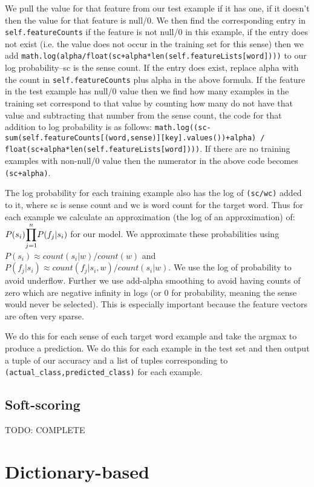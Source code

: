 \documentclass{article}
\begin{document}
We pull the value for that feature from our test example if it has one, if it doesn't then the value for that feature is null/0. We then find the corresponding entry in \texttt{self.featureCounts} if the feature is not null/0 in this example, if the entry does not exist (i.e. the value does not occur in the training set for this sense) then we add \texttt{math.log(alpha/float(sc+alpha*len(self.featureLists[word])))} to our log probability--sc is the sense count. If the entry does exist, replace alpha with the count in \texttt{self.featureCounts} plus alpha in the above formula. If the feature in the test example has null/0 value then we find how many examples in the training set correspond to that value by counting how many do not have that value and subtracting that number from the sense count, the code for that addition to log probability is as follows: \texttt{math.log((sc-sum(self.featureCounts[(word,sense)][key].values())+alpha) / float(sc+alpha*len(self.featureLists[word])))}. If there are no training examples with non-null/0 value then the numerator in the above code becomes \texttt{(sc+alpha)}.

The log probability for each training example also has the log of \texttt{(sc/wc)} added to it, where sc is sense count and wc is word count for the target word. Thus for each example we calculate an approximation (the log of an approximation) of: $P(s_i)\mathlarger{\prod}_{j=1}^{n}P(f_j|s_i)$ for our model. We approximate these probabilities using $P(s_i) \approx count(s_i|w)/count(w)$ and $P(f_j|s_i) \approx count(f_j|s_i,w)/count(s_i|w)$. We use the log of probability to avoid underflow. Further we use add-alpha smoothing to avoid having counts of zero which are negative infinity in logs (or 0 for probability, meaning the sense would never be selected). This is especially important because the feature vectors are often very sparse.

We do this for each sense of each target word example and take the argmax to produce a prediction. We do this for each example in the test set and then output a tuple of our accuracy and a list of tuples corresponding to \texttt{(actual\_class,predicted\_class)} for each example. 

\subsection{Soft-scoring}

TODO: COMPLETE

\section{Dictionary-based}
\end{document}
